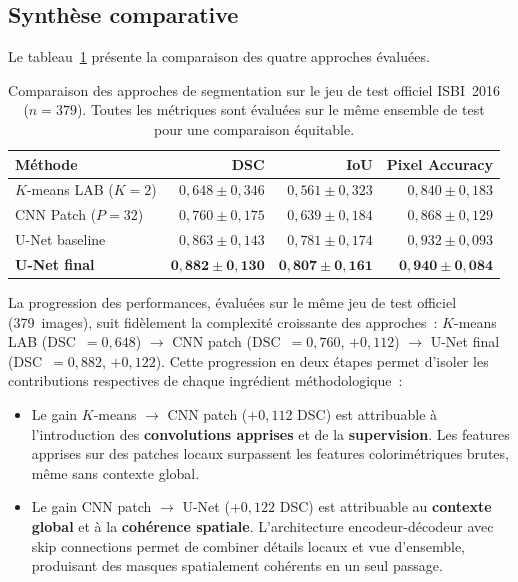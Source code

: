 \documentclass[12pt,a4paper]{article}
\begin{document}
\subsection{Synthèse comparative}
\label{subsec:synthese_comparative}

Le tableau~\ref{tab:comparatif} présente la comparaison des quatre approches évaluées.

\begin{table}[H]
\centering
\caption{Comparaison des approches de segmentation sur le jeu de test officiel ISBI~2016 ($n = 379$). Toutes les métriques sont évaluées sur le même ensemble de test pour une comparaison équitable.}
\label{tab:comparatif}
\begin{tabular}{l r r r}
\toprule
\textbf{Méthode} & \textbf{DSC} & \textbf{IoU} & \textbf{Pixel Accuracy} \\
\midrule
$K$-means LAB ($K{=}2$)     & $0{,}648 \pm 0{,}346$ & $0{,}561 \pm 0{,}323$ & $0{,}840 \pm 0{,}183$ \\
CNN Patch ($P{=}32$)         & $0{,}760 \pm 0{,}175$ & $0{,}639 \pm 0{,}184$ & $0{,}868 \pm 0{,}129$ \\
U-Net baseline               & $0{,}863 \pm 0{,}143$ & $0{,}781 \pm 0{,}174$ & $0{,}932 \pm 0{,}093$ \\
\textbf{U-Net final}         & $\mathbf{0{,}882 \pm 0{,}130}$ & $\mathbf{0{,}807 \pm 0{,}161}$ & $\mathbf{0{,}940 \pm 0{,}084}$ \\
\bottomrule
\end{tabular}
\end{table}

La progression des performances, évaluées sur le même jeu de test officiel (379~images), suit fidèlement la complexité croissante des approches~: $K$-means LAB (DSC~$= 0{,}648$) $\to$ CNN patch (DSC~$= 0{,}760$, $+0{,}112$) $\to$ U-Net final (DSC~$= 0{,}882$, $+0{,}122$). Cette progression en deux étapes permet d'isoler les contributions respectives de chaque ingrédient méthodologique~:

\begin{itemize}[nosep]
    \item Le gain $K$-means $\to$ CNN patch ($+0{,}112$ DSC) est attribuable à l'introduction des \textbf{convolutions apprises} et de la \textbf{supervision}. Les features apprises sur des patches locaux surpassent les features colorimétriques brutes, même sans contexte global.
    \item Le gain CNN patch $\to$ U-Net ($+0{,}122$ DSC) est attribuable au \textbf{contexte global} et à la \textbf{cohérence spatiale}. L'architecture encodeur-décodeur avec skip connections permet de combiner détails locaux et vue d'ensemble, produisant des masques spatialement cohérents en un seul passage.
\end{itemize}
\end{document}
